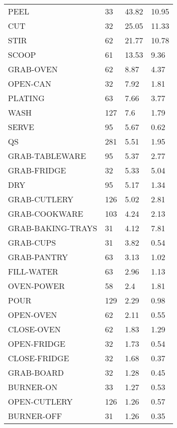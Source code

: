 {\begin{xltabular}{\textwidth}{X X X X}
PEEL                 & 33    & 43.82  & 10.95  \\
CUT                  & 32    & 25.05  & 11.33  \\
STIR                 & 62    & 21.77  & 10.78  \\
SCOOP                & 61    & 13.53  & 9.36   \\
GRAB-OVEN            & 62    & 8.87   & 4.37   \\
OPEN-CAN             & 32    & 7.92   & 1.81   \\
PLATING              & 63    & 7.66   & 3.77   \\
WASH                 & 127   & 7.6    & 1.79   \\
SERVE                & 95    & 5.67   & 0.62   \\
QS                   & 281   & 5.51   & 1.95   \\
GRAB-TABLEWARE       & 95    & 5.37   & 2.77   \\
GRAB-FRIDGE          & 32    & 5.33   & 5.04   \\
DRY                  & 95    & 5.17   & 1.34   \\
GRAB-CUTLERY         & 126   & 5.02   & 2.81   \\
GRAB-COOKWARE        & 103   & 4.24   & 2.13   \\
GRAB-BAKING-TRAYS    & 31    & 4.12   & 7.81   \\
GRAB-CUPS            & 31    & 3.82   & 0.54   \\
GRAB-PANTRY          & 63    & 3.13   & 1.02   \\
FILL-WATER           & 63    & 2.96   & 1.13   \\
OVEN-POWER           & 58    & 2.4    & 1.81   \\
POUR                 & 129   & 2.29   & 0.98   \\
OPEN-OVEN            & 62    & 2.11   & 0.55   \\
CLOSE-OVEN           & 62    & 1.83   & 1.29   \\
OPEN-FRIDGE          & 32    & 1.73   & 0.54   \\
CLOSE-FRIDGE         & 32    & 1.68   & 0.37   \\
GRAB-BOARD           & 32    & 1.28   & 0.45   \\
BURNER-ON            & 33    & 1.27   & 0.53   \\
OPEN-CUTLERY         & 126   & 1.26   & 0.57   \\
BURNER-OFF           & 31    & 1.26   & 0.35   \\

\end{xltabular}}
